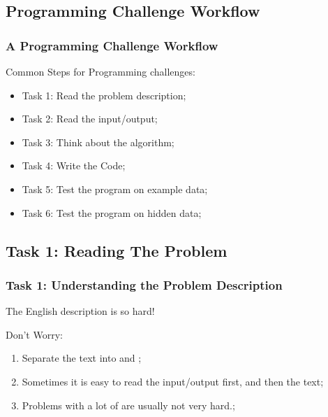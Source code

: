 \subsection{Programming Challenge Workflow}
\begin{frame}
  \frametitle{A Programming Challenge Workflow}

  Common Steps for Programming challenges:
  \bigskip

  \begin{itemize}
  \item Task 1: Read the problem description;
  \item Task 2: Read the input/output;
  \item Task 3: Think about the algorithm;
  \item Task 4: Write the Code;
  \item Task 5: Test the program on example data;
  \item Task 6: Test the program on hidden data;
  \end{itemize}
\end{frame}


\subsection{Task 1: Reading The Problem}
\begin{frame}
  \frametitle{Task 1: Understanding the Problem Description}

  The English description is so hard!

  \bigskip

  \begin{block}{Don't Worry:}
  \begin{enumerate}
  \item Separate the text into  and ;
  \item Sometimes it is easy to read the input/output first, and then
    the text;
  \item Problems with a lot of  are usually not very hard.;
  \end{enumerate}
  \end{block}
\end{frame}

